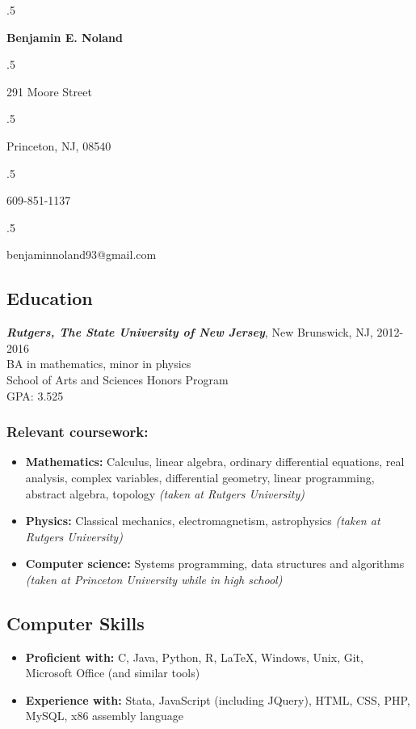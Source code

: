 \documentclass[12pt]{article}
\begin{document}
\moveleft.5\hoffset\centerline{\large\bf Benjamin E. Noland}
\smallskip
\moveleft.5\hoffset\centerline{291 Moore Street}
\moveleft.5\hoffset\centerline{Princeton, NJ, 08540}
\moveleft.5\hoffset\centerline{609-851-1137}
\moveleft.5\hoffset\centerline{benjaminnoland93@gmail.com}

\subsection*{Education}

\textit{\textbf{Rutgers, The State University of New Jersey}}, New Brunswick, NJ, 2012-2016 \\
BA in mathematics, minor in physics \\
School of Arts and Sciences Honors Program \\
GPA: 3.525

\subsubsection*{Relevant coursework:}
\begin{itemize}
\item
\textbf{Mathematics:} Calculus, linear algebra, ordinary differential equations, real analysis, complex variables, differential geometry, linear programming, abstract algebra, topology \textit{(taken at Rutgers University)}

\item
\textbf{Physics:}
Classical mechanics, electromagnetism, astrophysics \textit{(taken at Rutgers University)}

\item
\textbf{Computer science:}
Systems programming, data structures and algorithms \textit{(taken at Princeton University while in high school)}
\end{itemize}

\subsection*{Computer Skills}
\begin{itemize}
\item
\textbf{Proficient with:} C, Java, Python, R, \LaTeX, Windows, Unix, Git, Microsoft Office (and similar tools)

\item
\textbf{Experience with:} Stata, JavaScript (including JQuery), HTML, CSS, PHP, MySQL, x86 assembly language
\end{itemize}
\end{document}
